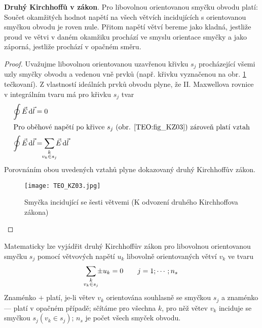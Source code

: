 {      \textbf{Druhý Kirchhoffů v zákon}. Pro libovolnou orientovanou smyčku obvodu platí: Součet 
      okamžitých hodnot napětí na všech větvích incidujících s orientovanou smyčkou obvodu je roven 
      nule. Přitom napětí větví bereme jako kladná, jestliže proud ve větvi v daném okamžiku 
      prochází ve smyslu orientace smyčky a jako záporná, jestliže prochází v opačném směru.
      
      \begin{proof}
        Uvažujme libovolnou orientovanou uzavřenou křivku \(s_j\) procházející všemi uzly smyčky 
        obvodu a vedenou vně prvků (např. křivku vyznačenou na obr. \ref{TEO:fig_KZ03} tečkovaní). 
        Z vlastností ideálních prvků obvodu plyne, že II. Maxwellova rovnice v integrálním tvaru má 
        pro křivku \(s_j\) tvar
        \begin{align}
          \oint\vec{E}\dd{\vec{l}} &= 0    \label{TEO:eq_KZ01} \\
          \shortintertext{Pro oběhové napětí po křivce \(s_j\) (obr. \ref{TEO:fig_KZ03}) zároveň 
                          platí vztah}
          \oint\vec{E}\dd{\vec{l}} &= \sum_{\mathclap{\substack{k\\v_k\in s_j}}}\vec{E}\dd{\vec{l}}
        \end{align}
        Porovnáním obou uvedených vztahů plyne dokazovaný druhý Kirchhoffův zákon.
        \begin{figure}[ht!]
          \centering
          \texttt{[image: TEO\_KZ03.jpg]}
          \caption{Smyčka incidující se šesti větvemi (K odvození druhého Kirchhoffova 
                   zákona)\cite[s.~48]{Meyer1978}}
          \label{TEO:fig_KZ03}
        \end{figure}
      \end{proof}
      Matematicky lze vyjádřit druhý Kirchhoffův zákon pro libovolnou orientovanou smyčku \(s_j\) 
      pomocí větvových napětí \(u_k\) libovolně orientovaných větví \(v_k\) ve tvaru
      \begin{equation}\label{TEO:eq_KZ03}
        \sum_{\mathclap{\substack{k\\v_k\in s_j}}} \pm u_k = 0 \qquad j=1;\cdots; n_s
      \end{equation}
      Znaménko \(+\) platí, je-li větev \(v_k\) orientována souhlasně se smyčkou \(s_j\) a znaménko 
      \(—\) platí v opačném případě; sčítáme pro všechna \(k\), pro něž větev \(v_k\) inciduje se 
      smyčkou \(s_j (v_k\in s_j)\); \(n_s\) je počet všech smyček obvodu.
      
}
